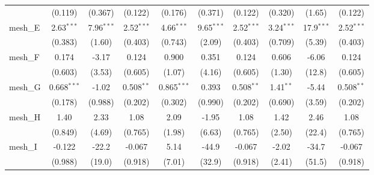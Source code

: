 \begin{tabular}{lccccccccc}
                                                               & (0.119)        & (0.367)        & (0.122)        & (0.176)        & (0.371)        & (0.122)        & (0.320)        & (1.65)         & (0.122)\\   
   mesh\_E                                                     & 2.63$^{***}$   & 7.96$^{***}$   & 2.52$^{***}$   & 4.66$^{***}$   & 9.65$^{***}$   & 2.52$^{***}$   & 3.24$^{***}$   & 17.9$^{***}$   & 2.52$^{***}$\\   
                                                               & (0.383)        & (1.60)         & (0.403)        & (0.743)        & (2.09)         & (0.403)        & (0.709)        & (5.39)         & (0.403)\\   
   mesh\_F                                                     & 0.174          & -3.17          & 0.124          & 0.900          & 0.351          & 0.124          & 0.606          & -6.06          & 0.124\\   
                                                               & (0.603)        & (3.53)         & (0.605)        & (1.07)         & (4.16)         & (0.605)        & (1.30)         & (12.8)         & (0.605)\\   
   mesh\_G                                                     & 0.668$^{***}$  & -1.02          & 0.508$^{**}$   & 0.865$^{***}$  & 0.393          & 0.508$^{**}$   & 1.41$^{**}$    & -5.44          & 0.508$^{**}$\\   
                                                               & (0.178)        & (0.988)        & (0.202)        & (0.302)        & (0.990)        & (0.202)        & (0.690)        & (3.59)         & (0.202)\\   
   mesh\_H                                                     & 1.40           & 2.33           & 1.08           & 2.09           & -1.95          & 1.08           & 1.42           & 2.46           & 1.08\\   
                                                               & (0.849)        & (4.69)         & (0.765)        & (1.98)         & (6.63)         & (0.765)        & (2.50)         & (22.4)         & (0.765)\\   
   mesh\_I                                                     & -0.122         & -22.2          & -0.067         & 5.14           & -44.9          & -0.067         & -2.02          & -34.7          & -0.067\\   
                                                               & (0.988)        & (19.0)         & (0.918)        & (7.01)         & (32.9)         & (0.918)        & (2.41)         & (51.5)         & (0.918)\\   

\end{tabular}
